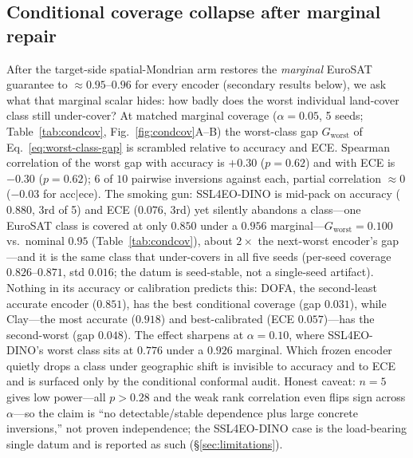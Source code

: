 \documentclass[preprint,11pt,authoryear]{elsarticle}
\begin{document}
\subsection*{Conditional coverage collapse after marginal repair}
After the target-side spatial-Mondrian arm restores the \emph{marginal} EuroSAT guarantee to
$\approx0.95$--$0.96$ for every encoder (secondary results below), we ask what that marginal scalar hides:
how badly does the worst individual land-cover class still under-cover? At matched marginal coverage
($\alpha{=}0.05$, 5 seeds; Table~\ref{tab:condcov}, Fig.~\ref{fig:condcov}A--B) the worst-class gap
$G_{\mathrm{worst}}$ of Eq.~\eqref{eq:worst-class-gap} is scrambled relative to
accuracy and ECE. Spearman correlation of the worst gap with accuracy is $+0.30$ ($p{=}0.62$) and with
ECE is $-0.30$ ($p{=}0.62$); $6$ of $10$ pairwise inversions
against each, partial correlation $\approx0$ ($-0.03$ for acc$\mid$ece). The smoking gun: SSL4EO-DINO is
mid-pack on accuracy ($0.880$, 3rd of 5) and ECE ($0.076$, 3rd) yet silently abandons a class---one
EuroSAT class is covered at only $0.850$ under a $0.956$ marginal---$G_{\mathrm{worst}}=0.100$
vs.\ nominal $0.95$ (Table~\ref{tab:condcov}), about $2\times$ the next-worst encoder's gap---and it is the same class that under-covers in all
five seeds (per-seed coverage $0.826$--$0.871$, std $0.016$; the datum is seed-stable, not a single-seed
artifact). Nothing in its accuracy or calibration predicts this:
DOFA, the second-least accurate encoder ($0.851$), has the best conditional coverage (gap
$0.031$), while Clay---the most accurate ($0.918$) and best-calibrated (ECE $0.057$)---has the
second-worst (gap $0.048$). The effect sharpens at $\alpha{=}0.10$, where SSL4EO-DINO's worst class
sits at $0.776$ under a $0.926$ marginal. Which frozen encoder quietly drops a class under geographic shift
is invisible to accuracy and to ECE and is surfaced only by the conditional conformal audit. Honest
caveat: $n{=}5$ gives low power---all $p>0.28$ and the weak rank correlation even flips sign across
$\alpha$---so the claim is ``no detectable/stable dependence plus large concrete inversions,'' not proven
independence; the SSL4EO-DINO case is the load-bearing single datum and is reported as such
(\S\ref{sec:limitations}).
\end{document}
